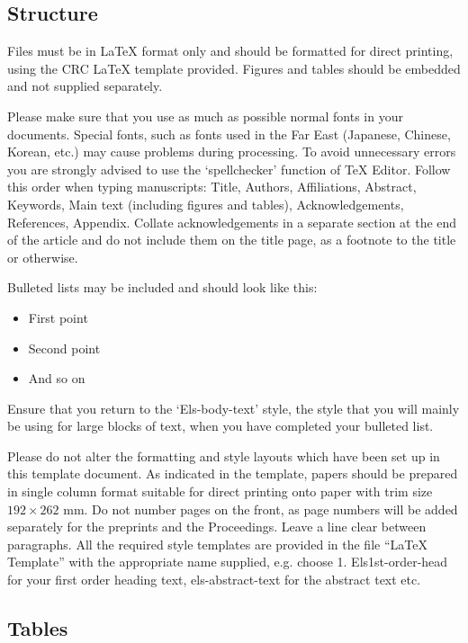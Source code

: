 \documentclass[5p,times,procedia]{elsarticle}
\begin{document}
\subsection{ Structure}
Files must be in LaTeX format only and should be formatted for direct printing, using the CRC LaTeX template provided. Figures and tables should be embedded and not supplied separately. 

Please make sure that you use as much as possible normal fonts in your documents. Special fonts, such as fonts used in\vadjust{\vfill\pagebreak} the Far East (Japanese, Chinese, Korean, etc.) may cause problems during processing. To avoid unnecessary errors you are strongly advised to use the `spellchecker' function of TeX Editor. Follow this order when typing manuscripts: Title, Authors, Affiliations, Abstract, Keywords, Main text (including figures and tables), Acknowledgements, References, Appendix. Collate acknowledgements in a separate section at the end of the article and do not include them on the title page, as a footnote to the title or otherwise.

Bulleted lists may be included and should look like this:
\begin{itemize}[]
\item First point
\item Second point
\item And so on
\end{itemize}

Ensure that you return to the `Els-body-text' style, the style that you will mainly be using for large blocks of text, when you have completed your bulleted list. 

Please do not alter the formatting and style layouts which have been set up in this template document. As indicated in the template, papers should be prepared in single column format suitable for direct printing onto paper with trim size $192 \times 262$ mm. Do not number pages on the front, as page numbers will be added separately for the preprints and the Proceedings. Leave a line clear between paragraphs. All the required style templates are provided in the file ``LaTeX Template'' with the appropriate name supplied, e.g. choose 1. Els1st-order-head for your first order heading text, els-abstract-text for the abstract text etc.

\subsection{ Tables}
\end{document}
